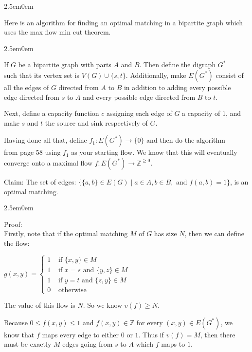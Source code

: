 \documentclass{book}
\newcommand{\hTwo}{%
   \color{MidnightBlue}%
   \fontsize{13}{15}\selectfont%
}
\newcommand{\hThree}{%
   \color{PineGreen}
   \fontsize{13}{15}\selectfont%
}
\newcommand{\hFour}{%
   \color{Cerulean}
   \fontsize{12}{14}\selectfont%
}
\newenvironment{myIndent}{%
   \begin{adjustwidth}{2.5em}{0em}%
}{%
   \end{adjustwidth}%
}
\newcommand{\retTwo}{\hfill\bigbreak}
\begin{document}
{\begin{myIndent} \hTwo
   Here is an algorithm for finding an optimal matching in a bipartite graph which uses the max flow min cut theorem.
   
   {\begin{myIndent} \hThree
      If $G$ be a bipartite graph with parts $A$ and $B$. Then define the digraph $G^*$\\ such that its vertex set is $V(G) \cup \{s, t\}$. Additionally, make $E(G^*)$ consist of\\ all the edges of $G$ directed from $A$ to $B$ in addition to adding every possible\\ edge directed from $s$ to $A$ and every possible edge directed from $B$ to $t$.\newpage

      Next, define a capacity function $c$ assigning each edge of $G$ a capacity of $1$, and make $s$ and $t$ the source and sink respectively of $G$.\retTwo

      Having done all that, define $f_1: E(G^*) \rightarrow \{0\}$ and then do the algorithm\\ from page 58 using $f_1$ as your starting flow. We know that this will eventually converge onto a maximal flow $f: E(G^*) \rightarrow \mathbb{Z}^{\geq 0}$.\retTwo

      Claim: The set of edges: $\{\{a, b\} \in E(G) \mid a \in A, b \in B, \text{ and } f(a, b) = 1\}$, is an optimal matching.
      {\begin{myIndent} \hFour
         Proof:\\
         Firstly, note that if the optimal matching $M$ of $G$ has size $N$, then we can define the flow:\\[-10pt]

         {\center $ g(x, y) = \left\{
         \begin{matrix}
            1 & \text{ if } \{x, y\} \in M\phantom{x=s \text{ and }}  \\
            1 & \text{ if } x=s \text{ and } \{y, z\} \in M \\
            1 & \text{ if } y=t \text{ and } \{z, y\} \in M \\
            0 & \text{ otherwise }\phantom{aaaaaaaaaaa}
         \end{matrix}\right.\quad$\retTwo\par} 

         The value of this flow is $N$. So we know $v(f) \geq N$.
         \retTwo

         Because $0 \leq f(x, y) \leq 1$ and $f(x, y) \in \mathbb{Z}$ for every $(x, y) \in E(G^*)$, we\\ know that $f$ maps every edge to either $0$ or $1$. Thus if $v(f) = M$, then there\\ must be exactly  $M$ edges going from $s$ to $A$ which $f$ maps to $1$.\retTwo
         

\end{myIndent}}
\end{myIndent}}
\end{myIndent}}
\end{document}
